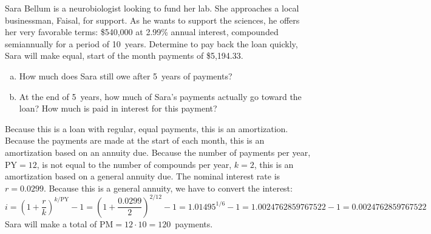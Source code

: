 \documentclass[11pt,letterpaper]{article}
\begin{document}
\newpage



 Sara Bellum is a neurobiologist looking to fund her lab. She approaches a local businessman, Faisal, for support. As he wants to support the sciences, he offers her very favorable terms: \$540,000 at 2.99\% annual interest, compounded semiannually for a period of 10~years. Determine to pay back the loan quickly, Sara will make equal, start of the month payments of \$5,194.33.
	\begin{enumerate}[(a)]
	\item How much does Sara still owe after 5~years of payments?
	\item At the end of 5~years, how much of Sara's payments actually go toward the loan? How much is paid in interest for this payment?
	\end{enumerate} \pspace

\sol Because this is a loan with regular, equal payments, this is an amortization. Because the payments are made at the start of each month, this is an amortization based on an annuity due. Because the number of payments per year, $\text{PY}= 12$, is not equal to the number of compounds per year, $k= 2$, this is an amortization based on a general annuity due. The nominal interest rate is $r= 0.0299$. Because this is a general annuity, we have to convert the interest:
	\[
	i= \left(1 + \dfrac{r}{k} \right)^{k/\text{PY}} - 1= \left(1 + \dfrac{0.0299}{2} \right)^{2/12} - 1= 1.01495^{1/6} - 1= 1.0024762859767522 - 1= 0.0024762859767522
	\]
Sara will make a total of $\text{PM}= 12 \cdot 10= 120$~payments. 
\end{document}

